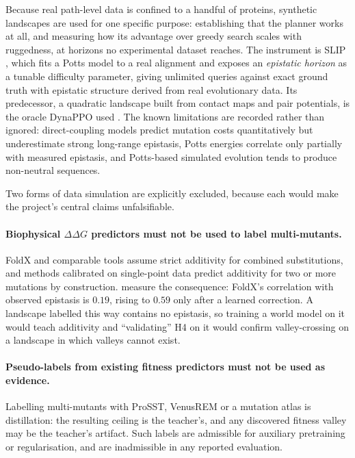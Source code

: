 \documentclass[12pt, a4paper]{article}
\begin{document}
Because real path-level data is confined to a handful of proteins, synthetic landscapes are used for one specific purpose: establishing that the planner works at all, and measuring how its advantage over greedy search scales with ruggedness, at horizons no experimental dataset reaches. The instrument is SLIP \citep{thomas2022slip}, which fits a Potts model to a real alignment and exposes an \textit{epistatic horizon} as a tunable difficulty parameter, giving unlimited queries against exact ground truth with epistatic structure derived from real evolutionary data. Its predecessor, a quadratic landscape built from contact maps and pair potentials, is the oracle DynaPPO used \citep{angermueller2020dynappo}. The known limitations are recorded rather than ignored: direct-coupling models predict mutation costs quantitatively but underestimate strong long-range epistasis, Potts energies correlate only partially with measured epistasis, and Potts-based simulated evolution tends to produce non-neutral sequences.

Two forms of data simulation are explicitly excluded, because each would make the project's central claims unfalsifiable.

\paragraph{Biophysical $\Delta\Delta G$ predictors must not be used to label multi-mutants.} FoldX and comparable tools assume strict additivity for combined substitutions, and methods calibrated on single-point data predict additivity for two or more mutations by construction. \citet{barnes2026foldx} measure the consequence: FoldX's correlation with observed epistasis is $0.19$, rising to $0.59$ only after a learned correction. A landscape labelled this way contains no epistasis, so training a world model on it would teach additivity and ``validating'' H4 on it would confirm valley-crossing on a landscape in which valleys cannot exist.

\paragraph{Pseudo-labels from existing fitness predictors must not be used as evidence.} Labelling multi-mutants with ProSST, VenusREM or a mutation atlas is distillation: the resulting ceiling is the teacher's, and any discovered fitness valley may be the teacher's artifact. Such labels are admissible for auxiliary pretraining or regularisation, and are inadmissible in any reported evaluation.
\end{document}
